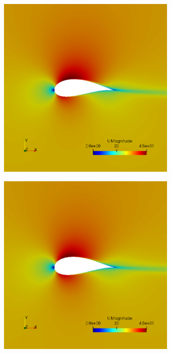 \begin{figure}[h!]
    \centering
    \begin{subfigure}[t]{0.31\textwidth}
        \includegraphics[width=0.95\textwidth, height=0.17\textheight]{Figures/4/LDAg10i11.png}
    \end{subfigure}
    \begin{subfigure}[t]{0.31\textwidth}
        \includegraphics[width=0.95\textwidth, height=0.17\textheight]{Figures/4/LDAg10i47.png}

\end{subfigure}
\end{figure}
